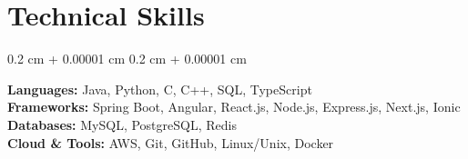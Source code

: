\documentclass[10pt, letterpaper]{article}
\newenvironment{highlights}{
    \begin{itemize}[
        topsep=0.10 cm,
        parsep=0.10 cm,
        partopsep=0pt,
        itemsep=0pt,
        leftmargin=0.4 cm + 10pt
    ]
}{
    \end{itemize}
} %
\newenvironment{onecolentry}{
    \begin{adjustwidth}{
        0.2 cm + 0.00001 cm
    }{
        0.2 cm + 0.00001 cm
    }
}{
    \end{adjustwidth}
} %
\newenvironment{twocolentry}[2][]{
    \onecolentry
    \def\secondColumn{#2}
    \setcolumnwidth{\fill, 4.5 cm}
    \begin{paracol}{2}
}{
    \switchcolumn \raggedleft \secondColumn
    \end{paracol}
    \endonecolentry
} %
\begin{document}
    \section{Technical Skills}
        \begin{onecolentry}
           \noindent
            \textbf{Languages:} Java, Python, C, C++, SQL, TypeScript \\
            \textbf{Frameworks:} Spring Boot, Angular, React.js, Node.js, Express.js, Next.js, Ionic \\
            \textbf{Databases:}  MySQL, PostgreSQL, Redis \\
            \textbf{Cloud \& Tools:} AWS, Git, GitHub, Linux/Unix, Docker \\
        \end{onecolentry}

\end{document}
